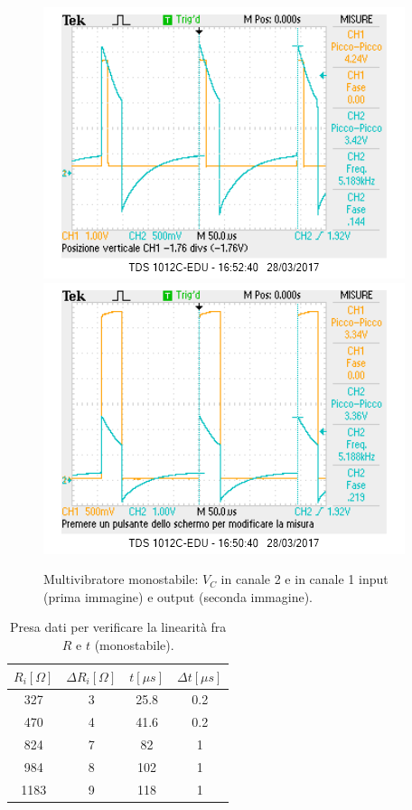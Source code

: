 \documentclass[10pt,a4paper]{article}
\begin{document}
\begin{figure}[!htb]
  \centering
  \includegraphics[scale=0.75]{1in2c.png}\includegraphics[scale=0.75]{1out2c}
\caption{Multivibratore monostabile: $V_C$ in canale 2 e in canale 1 input (prima immagine) e output (seconda immagine).\label{osc:monostabile}}
\end{figure}

\begin{table}[!htb]
\centering
\begin{tabular}{|c|c|c|c|}
\hline 
$R_i [\Omega ]$ & $\Delta R_i [\Omega ]$ & $t [\mu s]$ & $\Delta t [\mu s]$\\
\hline
 327 &  3 & 25.8 & 0.2\\ 
\hline 
 470 &  4 & 41.6 & 0.2\\ 
\hline
 824 &  7 & 82 & 1\\ 
\hline 
 984 &  8 & 102 & 1\\ 
\hline
 1183 &  9 & 118 & 1\\ 
\hline
\end{tabular} 
\caption{Presa dati per verificare la linearità fra $R$ e $t$ (monostabile).\label{tab:monostabile}}
\end{table}
\end{document}
